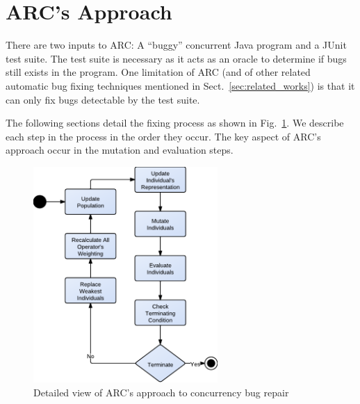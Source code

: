\section{ARC's Approach}
\label{sec:approach}



There are two inputs to ARC: A ``buggy'' concurrent Java program and a JUnit test
suite. The test suite is necessary as it acts as an oracle to determine if bugs still exists in the program. One limitation of ARC (and of other
related automatic bug fixing techniques mentioned in
Sect.~\ref{sec:related_works}) is that it can only fix bugs detectable by the
test suite.



The following sections detail the fixing process as shown in
Fig.~\ref{fig:phases_internals}. We describe each step in the process in the order they occur. The key aspect of ARC's approach occur in the mutation and evaluation steps.

\begin{figure}[t!]
  \centering
  \includegraphics[width=7cm]{figures/phases.pdf}
  \caption{Detailed view of ARC's approach to concurrency bug repair}
  \label{fig:phases_internals}
\end{figure}

